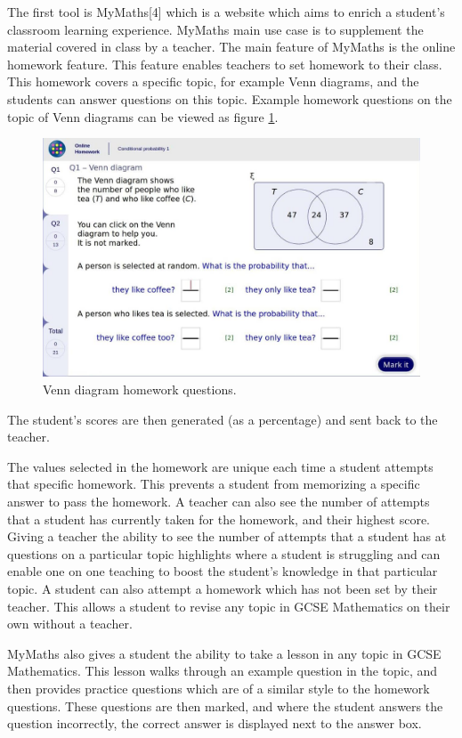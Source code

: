 \documentclass{article}
\begin{document}
The first tool is MyMaths[4] which is a website which aims to enrich a student's classroom learning experience. MyMaths main use case is to supplement the material covered in class by a teacher. The main feature of MyMaths is the online homework feature. This feature enables teachers to set homework to their class. This homework covers a specific topic, for example Venn diagrams, and the students can answer questions on this topic. Example homework questions on the topic of Venn diagrams can be viewed as figure \ref{figure:mymathsHomeworkQuestion1}.
\begin{figure}[H]
	\centering
	\includegraphics[width=0.9\linewidth]{./data/mymathsQuestion1.jpg}
	\caption{Venn diagram homework questions.}
	\label{figure:mymathsHomeworkQuestion1}
\end{figure}
The student's scores are then generated (as a percentage) and sent back to the teacher. \par

The values selected in the homework are unique each time a student attempts that specific homework. This prevents a student from memorizing a specific answer to pass the homework. A teacher can also see the number of attempts that a student has currently taken for the homework, and their highest score. Giving a teacher the ability to see the number of attempts that a student has at questions on a particular topic highlights where a student is struggling and can enable one on one teaching to boost the student's knowledge in that particular topic. A student can also attempt a homework which has not been set by their teacher. This allows a student to revise any topic in GCSE Mathematics on their own without a teacher. \par

MyMaths also gives a student the ability to take a lesson in any topic in GCSE Mathematics. This lesson walks through an example question in the topic, and then provides practice questions which are of a similar style to the homework questions. These questions are then marked, and where the student answers the question incorrectly, the correct answer is displayed next to the answer box. \par
\end{document}
